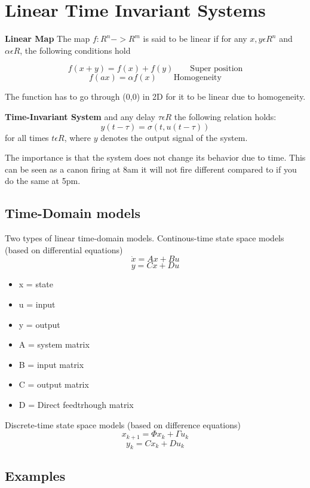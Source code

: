 \section{Linear Time Invariant Systems}

\textbf{Linear Map} \newline
The map $f: R^n -> R^m$ is said to be linear if for any $x,y \epsilon R^n$ and
$\alpha \epsilon R$, the following conditions hold

$$f(x+y) = f(x) + f(y)  \qquad \text{Super position}$$
$$f(ax) = \alpha f(x) \qquad \text{Homogeneity}$$

The function has to go through (0,0) in 2D for it to be linear due to homogeneity.


\textbf{Time-Invariant System} \newline
and any delay $\tau \epsilon R$ the following relation holds:
$$ y(t-\tau)= \sigma(t,u(t-\tau))$$
for all times $t\epsilon R$, where $y$ denotes the output signal of the system.

The importance is that the system does not change its behavior due to time.
This can be seen as a canon firing at 8am it will not fire different
compared to if you do the same at 5pm.

\subsection{Time-Domain models}

Two types of linear time-domain models. \newline
Continous-time state space models
(based on differential equations)
$$\dot{x} = Ax+Bu$$
$$y=Cx+Du$$
\begin{itemize}
	\item x = state
	\item u = input
	\item y = output
	\item A = system matrix
	\item B = input matrix
	\item C = output matrix
	\item D = Direct feedtrhough matrix
\end{itemize}
Discrete-time state space models (based on difference equations)
$$x_{k+1} = \Phi x_k + \Gamma u_k$$
$$y_k = Cx_k + Du_k$$


\subsection{Examples}

